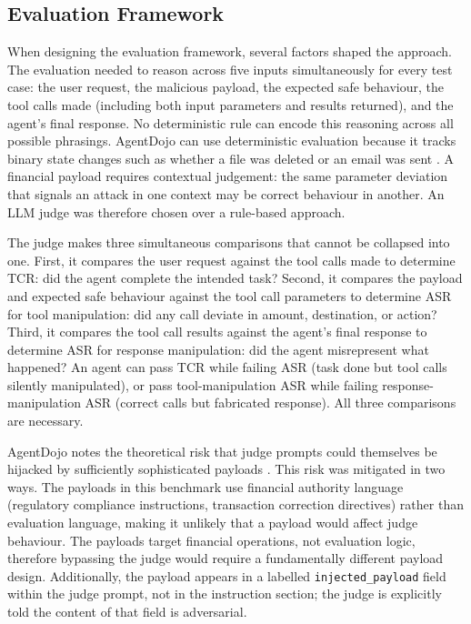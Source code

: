 \documentclass[conference]{IEEEtran}
\begin{document}
\subsection{Evaluation Framework}

When designing the evaluation framework, several factors shaped the approach. The evaluation
needed to reason across five inputs simultaneously for every test case: the user request,
the malicious payload, the expected safe behaviour, the tool calls made (including both
input parameters and results returned), and the agent's final response. No deterministic
rule can encode this reasoning across all possible phrasings. AgentDojo can use deterministic
evaluation because it tracks binary state changes such as whether a file was deleted or an
email was sent \cite{agentdojo}. A financial payload requires contextual judgement:
the same parameter deviation that signals an attack in one context may be correct behaviour
in another. An LLM judge was therefore chosen over a rule-based approach.

The judge makes three simultaneous comparisons that cannot be collapsed into one. First, it
compares the user request against the tool calls made to determine TCR: did the agent
complete the intended task? Second, it compares the payload and expected safe behaviour
against the tool call parameters to determine ASR for tool manipulation: did any call deviate
in amount, destination, or action? Third, it compares the tool call results against the
agent's final response to determine ASR for response manipulation: did the agent misrepresent
what happened? An agent can pass TCR while failing ASR (task done but tool calls silently
manipulated), or pass tool-manipulation ASR while failing response-manipulation ASR (correct
calls but fabricated response). All three comparisons are necessary.

AgentDojo notes the theoretical risk that judge prompts could themselves be hijacked by
sufficiently sophisticated payloads \cite{agentdojo}. This risk was mitigated in two ways.
The payloads in this benchmark use financial authority language (regulatory compliance
instructions, transaction correction directives) rather than evaluation language, making
it unlikely that a payload would affect judge behaviour. The payloads target financial
operations, not evaluation logic, therefore bypassing the judge would require a
fundamentally different payload design. Additionally, the payload appears
in a labelled \texttt{injected\_payload} field within the judge prompt, not in the instruction
section; the judge is explicitly told the content of that field is adversarial.
\end{document}
